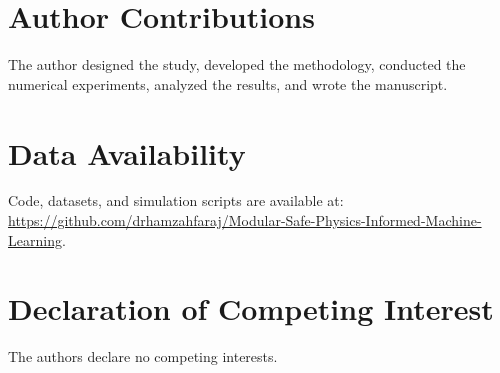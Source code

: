 \documentclass[12pt,a4paper]{article}
\begin{document}
\section{Author Contributions}
The author designed the study, developed the methodology, conducted
the numerical experiments, analyzed the results, and wrote the
manuscript.

\section{Data Availability}
Code, datasets, and simulation scripts are available at:\\
\url{https://github.com/drhamzahfaraj/Modular-Safe-Physics-Informed-Machine-Learning}.

\section{Declaration of Competing Interest}
The authors declare no competing interests.



\end{document}
